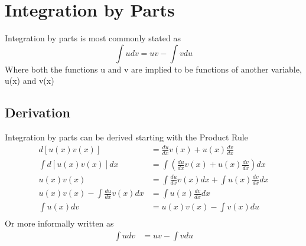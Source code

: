 \section{Integration by Parts}
Integration by parts is most commonly stated as
\[\int{udv} = uv - \int{vdu}\]
Where both the functions u and v are implied to be functions of another variable, u(x) and v(x)

\subsection{Derivation}
Integration by parts can be derived starting with the Product Rule
\begin{align*}
d\left[ u(x)v(x) \right] &= \frac{du}{dx}v(x) + u(x)\frac{dv}{dx} \\
\int{d\left[ u(x)v(x) \right]dx} &= \int{\left(\frac{du}{dx}v(x) + u(x)\frac{dv}{dx}\right)dx} \\
u(x)v(x) &= \int{\frac{du}{dx}v(x)dx} + \int{u(x)\frac{dv}{dx}dx} \\
u(x)v(x) - \int{\frac{du}{dx}v(x)dx} &=  \int{u(x)\frac{dv}{dx}dx} \\
\int{u(x)dv} &= u(x)v(x) - \int{v(x)du} \\
\end{align*}
Or more informally written as
\begin{align*}
\int{udv} &= uv - \int{vdu} 
\end{align*}
